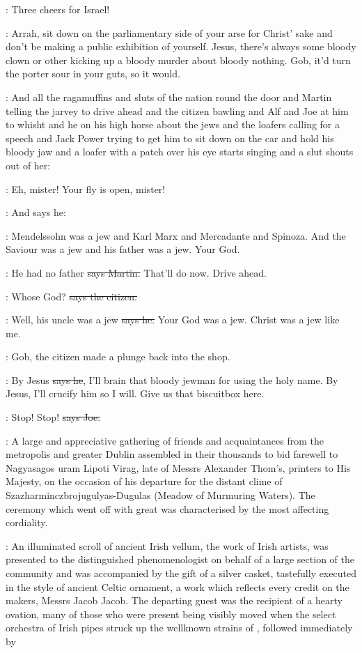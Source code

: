 \citizen:
Three cheers for Israel!

\Nq:
Arrah,
sit down on the parliamentary side of your arse for Christ'
sake and don't be making a public exhibition of yourself.
Jesus,
there's always some bloody clown or other kicking up a bloody murder about bloody nothing.
Gob,
it'd turn the porter sour in your guts,
so it would.

\Nq:
And all the ragamuffins and sluts of the nation round the door and Martin
telling the jarvey to drive ahead and the citizen bawling and Alf and
Joe at him to whisht and he on his high horse about the jews and the
loafers calling for a speech and Jack Power trying to get him to sit down
on the car and hold his bloody jaw
and a loafer with a patch over his eye
starts singing 
and a slut shouts out of her:

\ragamuffin:
Eh,
mister!
Your fly is open,
mister!

\Nq:
And says he:

\Bloom:
Mendelssohn was a jew and Karl Marx and Mercadante and Spinoza.
And the Saviour was a jew and his father was a jew.
Your God.

\cunningham:
He had no father
\sout{says Martin.}
That'll do now.
Drive ahead.

\citizen:
Whose God?
\sout{says the citizen.}

\Bloom:
Well,
his uncle was a jew
\sout{says he.}
Your God was a jew.
Christ was a jew like me.

\Nq:
Gob,
the citizen made a plunge back into the shop.

\citizen:
By Jesus
\sout{says he},
I'll brain that bloody jewman for using the holy name.
By Jesus,
I'll crucify him so I will.
Give us that biscuitbox here.

\joe:
Stop!
Stop!
\sout{says Joe.}

:
A large and appreciative gathering of friends and acquaintances from
the metropolis and greater Dublin assembled in their thousands
to bid farewell to Nagyasagos uram Lipoti Virag,
late of Messrs Alexander Thom's,
printers to His Majesty,
on the occasion of his departure for the distant clime of Szazharminczbrojugulyas-Dugulas
(Meadow of Murmuring Waters).
The ceremony which went off with great 
was
characterised by the most affecting cordiality.%

:
An illuminated scroll of ancient Irish vellum,
the work of Irish artists,
was presented to the
distinguished phenomenologist on behalf of a large section of the
community and was accompanied by the gift of a silver casket,
tastefully executed in the style of ancient Celtic ornament,
a work which reflects
every credit on the makers,
Messrs Jacob  Jacob.
The departing guest
was the recipient of a hearty ovation,
many of those who were present
being visibly moved when the select orchestra of Irish pipes struck up the
wellknown strains of ,
followed immediately by 


